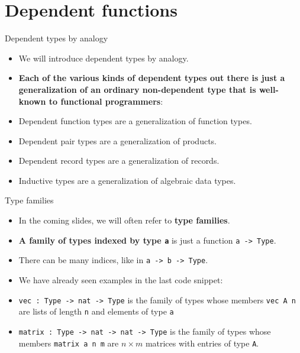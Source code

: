 \documentclass{beamer}
\newcommand{\m}[1]{\texttt{#1}}
\begin{document}
\section{Dependent functions}


\begin{frame}{Dependent types by analogy}
\begin{itemize}
	\item We will introduce dependent types by analogy.
	\item \textbf{Each of the various kinds of dependent types out there is just a generalization of an ordinary non-dependent type that is well-known to functional programmers}:
	\item Dependent function types are a generalization of function types.
	\item Dependent pair types are a generalization of products.
	\item Dependent record types are a generalization of records.
	\item Inductive types are a generalization of algebraic data types.
\end{itemize}
\end{frame}

\begin{frame}{Type families}
\begin{itemize}
	\item In the coming slides, we will often refer to \textbf{type families}.
	\item \textbf{A family of types indexed by type \m{a}} is just a function \m{a -> Type}.
	\item There can be many indices, like in \m{a -> b -> Type}.
	\item We have already seen examples in the last code snippet:
	\item \m{vec :\ Type -> nat -> Type} is the family of types whose members \m{vec A n} are lists of length \m{n} and elements of type \m{a}
	\item \m{matrix :\ Type -> nat -> nat -> Type} is the family of types whose members \m{matrix a n m} are $n \times m$ matrices with entries of type \m{A}.
\end{itemize}
\end{frame}
\end{document}
